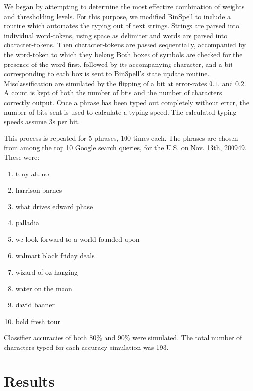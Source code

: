 \documentclass[12pt,titlepage]{article}
\begin{document}
We began by attempting to determine the most effective combination of weights and 
thresholding levels.  For this purpose, we modified BinSpell to include a routine which 
automates the typing out of text strings.  Strings are parsed  into individual word-tokens, using 
space as delimiter and words are parsed into character-tokens.  Then character-tokens are 
passed sequentially, accompanied by the word-token to which they belong  Both boxes of 
symbols are checked for the presence of the word first, followed by its accompanying 
character, and a bit corresponding to each box is sent to BinSpell's state update routine. 
Misclassification are simulated by the flipping of a bit at error-rates $0.1$, and $0.2$.  A count is 
kept of both the number of bits and the number of characters correctly output.  Once a phrase 
has been typed out completely without error, the number of bits sent is used to calculate a 
typing speed.  The calculated typing speeds assume 3s per bit.

This process is repeated for 5 phrases, 100 times each.  The phrases are chosen from  among 
the top 10 Google search queries, for the  U.S. on Nov. 13th, 200949.  These were: 
\begin{enumerate}
\item tony alamo 
\item harrison barnes 
\item what drives edward phase 
\item palladia 
\item we look forward to a world founded upon 
\item walmart black friday deals 
\item wizard of oz hanging 
\item water on the moon 
\item david banner 
\item bold fresh tour
\end{enumerate}

Classifier accuracies of both 80\% and 90\% were simulated.  The total number of characters 
typed for each accuracy simulation was 193.

\section{Results}
\end{document}
